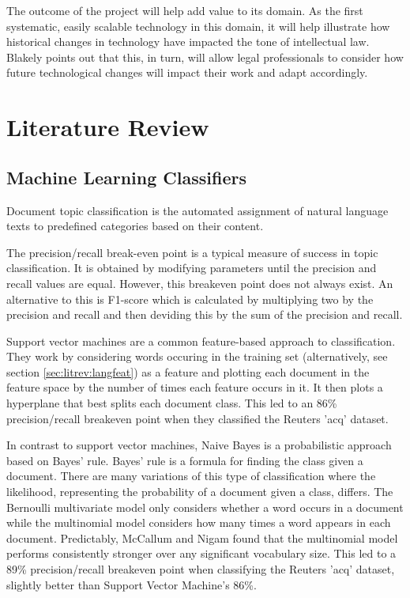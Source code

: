 			The outcome of the project will help add value to its domain. As the first systematic, easily scalable technology in this domain, it will help illustrate how historical changes in technology have impacted the tone of intellectual law. Blakely points out that this, in turn, will allow legal professionals to consider how future technological changes will impact their work and adapt accordingly.
	\section{Literature Review} \label{sec:litrev}	
		\subsection{Machine Learning Classifiers} \label{sec:litrev:mlclass}
			Document topic classification is the automated assignment of natural language texts to predefined categories based on their content\cite{ml_automated_categorisation}. 
			
			The precision/recall break-even point is a typical measure of success in topic classification\cite{encyc_breakeven_sammut}. It is obtained by modifying parameters until the precision and recall values are equal. However, this breakeven point does not always exist\cite{bigrams_enhance_categorisation}. An alternative to this is F1-score which is calculated by multiplying two by the precision and recall and then deviding this by the sum of the precision and recall. 
		
			Support vector machines are a common feature-based approach to classification. They work by considering words occuring in the training set (alternatively, see section \ref{sec:litrev:langfeat}) as a feature and plotting each document in the feature space by the number of times each feature occurs in it. It then plots a hyperplane that best splits each document class. This led to an 86\% precision/recall breakeven point when they classified the Reuters 'acq' dataset\cite{svm_joachims}. %
			
			In contrast to support vector machines, Naive Bayes is a probabilistic approach based on Bayes' rule. Bayes' rule is a formula for finding the class given a document. There are many variations of this type of classification where the likelihood, representing the probability of a document given a class, differs. The Bernoulli multivariate model only considers whether a word occurs in a document while the multinomial model considers how many times a word appears in each document. Predictably, McCallum and Nigam found that the multinomial model performs consistently stronger over any significant vocabulary size. This led to a 89\% precision/recall breakeven point when classifying the Reuters 'acq' dataset, slightly better than Support Vector Machine's 86\%.%

